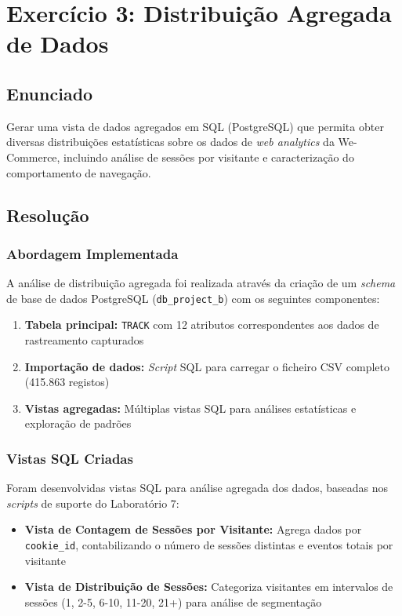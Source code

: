 \documentclass[11pt,a4paper]{article}
\begin{document}
\newpage

\section{Exercício 3: Distribuição Agregada de Dados}

\subsection{Enunciado}

Gerar uma vista de dados agregados em SQL (PostgreSQL) que permita obter diversas distribuições estatísticas sobre os dados de \textit{web analytics} da We-Commerce, incluindo análise de sessões por visitante e caracterização do comportamento de navegação.

\subsection{Resolução}

\subsubsection{Abordagem Implementada}

A análise de distribuição agregada foi realizada através da criação de um \textit{schema} de base de dados PostgreSQL (\texttt{db\_project\_b}) com os seguintes componentes:

\begin{enumerate}
    \item \textbf{Tabela principal:} \texttt{TRACK} com 12 atributos correspondentes aos dados de rastreamento capturados
    \item \textbf{Importação de dados:} \textit{Script} SQL para carregar o ficheiro CSV completo (415.863 registos)
    \item \textbf{Vistas agregadas:} Múltiplas vistas SQL para análises estatísticas e exploração de padrões
\end{enumerate}

\subsubsection{Vistas SQL Criadas}

Foram desenvolvidas vistas SQL para análise agregada dos dados, baseadas nos \textit{scripts} de suporte do Laboratório 7:

\begin{itemize}
    \item \textbf{Vista de Contagem de Sessões por Visitante:} Agrega dados por \texttt{cookie\_id}, contabilizando o número de sessões distintas e eventos totais por visitante
    \item \textbf{Vista de Distribuição de Sessões:} Categoriza visitantes em intervalos de sessões (1, 2-5, 6-10, 11-20, 21+) para análise de segmentação
\end{itemize}
\end{document}
